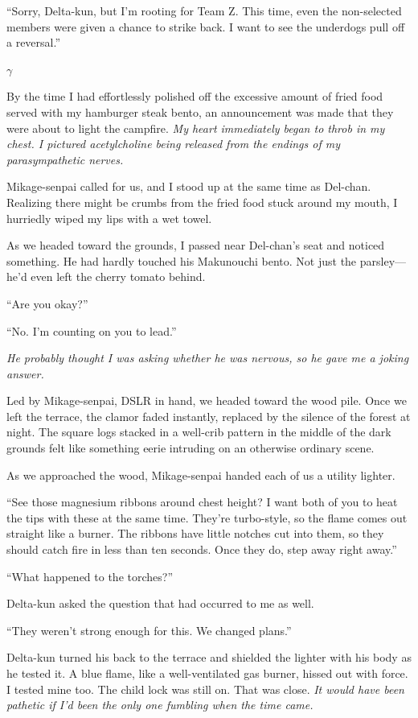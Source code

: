 \documentclass[
    a4paper,
    12pt,
    twoside,
    openany,
    UTF8,
    fontset=windows
]{ctexbook}
\begin{document}
``Sorry, Delta-kun, but I'm rooting for Team Z. This time, even the non-selected members were given a chance to strike back. I want to see the underdogs pull off a reversal.''

$\gamma$

By the time I had effortlessly polished off the excessive amount of fried food served with my hamburger steak bento, an announcement was made that they were about to light the campfire. \textit{My heart immediately began to throb in my chest. I pictured acetylcholine being released from the endings of my parasympathetic nerves.}

Mikage-senpai called for us, and I stood up at the same time as Del-chan. Realizing there might be crumbs from the fried food stuck around my mouth, I hurriedly wiped my lips with a wet towel.

As we headed toward the grounds, I passed near Del-chan's seat and noticed something. He had hardly touched his Makunouchi bento. Not just the parsley---he'd even left the cherry tomato behind.

``Are you okay?''

``No. I'm counting on you to lead.''

\textit{He probably thought I was asking whether he was nervous, so he gave me a joking answer.}

Led by Mikage-senpai, DSLR in hand, we headed toward the wood pile. Once we left the terrace, the clamor faded instantly, replaced by the silence of the forest at night. The square logs stacked in a well-crib pattern in the middle of the dark grounds felt like something eerie intruding on an otherwise ordinary scene.

As we approached the wood, Mikage-senpai handed each of us a utility lighter.

``See those magnesium ribbons around chest height? I want both of you to heat the tips with these at the same time. They're turbo-style, so the flame comes out straight like a burner. The ribbons have little notches cut into them, so they should catch fire in less than ten seconds. Once they do, step away right away.''

``What happened to the torches?''

Delta-kun asked the question that had occurred to me as well.

``They weren't strong enough for this. We changed plans.''

Delta-kun turned his back to the terrace and shielded the lighter with his body as he tested it. A blue flame, like a well-ventilated gas burner, hissed out with force. I tested mine too. The child lock was still on. That was close. \textit{It would have been pathetic if I'd been the only one fumbling when the time came.}
\end{document}
